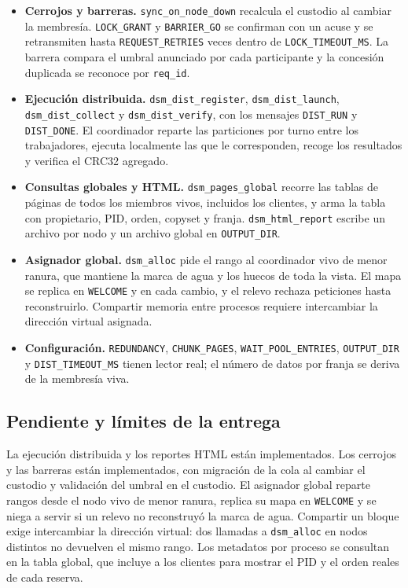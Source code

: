 \documentclass[11pt,spanish]{article}
\begin{document}
\begin{itemize}[leftmargin=1.5em, itemsep=0.3em]
    \item \textbf{Cerrojos y barreras.} \texttt{sync\_on\_node\_down} recalcula el custodio al cambiar la membresía. \texttt{LOCK\_GRANT} y \texttt{BARRIER\_GO} se confirman con un acuse y se retransmiten hasta \texttt{REQUEST\_RETRIES} veces dentro de \texttt{LOCK\_TIMEOUT\_MS}. La barrera compara el umbral anunciado por cada participante y la concesión duplicada se reconoce por \texttt{req\_id}.
    \item \textbf{Ejecución distribuida.} \texttt{dsm\_dist\_register}, \texttt{dsm\_dist\_launch}, \texttt{dsm\_dist\_collect} y \texttt{dsm\_dist\_verify}, con los mensajes \texttt{DIST\_RUN} y \texttt{DIST\_DONE}. El coordinador reparte las particiones por turno entre los trabajadores, ejecuta localmente las que le corresponden, recoge los resultados y verifica el CRC32 agregado.
    \item \textbf{Consultas globales y HTML.} \texttt{dsm\_pages\_global} recorre las tablas de páginas de todos los miembros vivos, incluidos los clientes, y arma la tabla con propietario, PID, orden, copyset y franja. \texttt{dsm\_html\_report} escribe un archivo por nodo y un archivo global en \texttt{OUTPUT\_DIR}.
    \item \textbf{Asignador global.} \texttt{dsm\_alloc} pide el rango al coordinador vivo de menor ranura, que mantiene la marca de agua y los huecos de toda la vista. El mapa se replica en \texttt{WELCOME} y en cada cambio, y el relevo rechaza peticiones hasta reconstruirlo. Compartir memoria entre procesos requiere intercambiar la dirección virtual asignada.
    \item \textbf{Configuración.} \texttt{REDUNDANCY}, \texttt{CHUNK\_PAGES}, \texttt{WAIT\_POOL\_ENTRIES}, \texttt{OUTPUT\_DIR} y \texttt{DIST\_TIMEOUT\_MS} tienen lector real; el número de datos por franja se deriva de la membresía viva.
\end{itemize}

\subsection{Pendiente y límites de la entrega}

La ejecución distribuida y los reportes HTML están implementados. Los cerrojos y las barreras están implementados, con migración de la cola al cambiar el custodio y validación del umbral en el custodio. El asignador global reparte rangos desde el nodo vivo de menor ranura, replica su mapa en \texttt{WELCOME} y se niega a servir si un relevo no reconstruyó la marca de agua. Compartir un bloque exige intercambiar la dirección virtual: dos llamadas a \texttt{dsm\_alloc} en nodos distintos no devuelven el mismo rango. Los metadatos por proceso se consultan en la tabla global, que incluye a los clientes para mostrar el PID y el orden reales de cada reserva.
\end{document}
